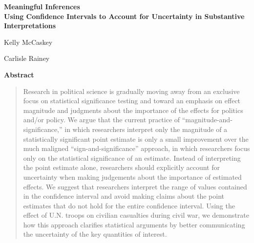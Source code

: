 \documentclass[12pt]{article}
\begin{document}
\begin{center}
{\LARGE \textbf{Meaningful Inferences}}\\\vspace{2mm}
{ \textbf{Using Confidence Intervals to Account for Uncertainty in Substantive Interpretations}}\\\vspace{2mm}


\vspace{10mm}

Kelly McCaskey

\vspace{3mm}

Carlisle Rainey
\end{center}

\vspace{10mm}

{\centerline{\textbf{Abstract}}}
\begin{quote}\noindent
Research in political science is gradually moving away from an exclusive focus on statistical significance testing and toward an emphasis on effect magnitude and judgments about the importance of the effects for politics and/or policy. We argue that the current practice of ``magnitude-and-significance,'' in which researchers interpret only the magnitude of a statistically significant point estimate is only a small improvement over the much maligned ``sign-and-significance'' approach, in which researchers focus only on the statistical significance of an estimate. Instead of interpreting the point estimate alone, researchers should explicitly account for uncertainty when making judgements about the importance of estimated effects. We suggest that researchers interpret the range of values contained in the confidence interval and avoid making claims about the point estimates that do not hold for the entire confidence interval. Using the effect of U.N. troops on civilian casualties during civil war, we demonstrate how this approach clarifies statistical arguments by better communicating the uncertainty of the key quantities of interest.
 \end{quote}
\end{document}
